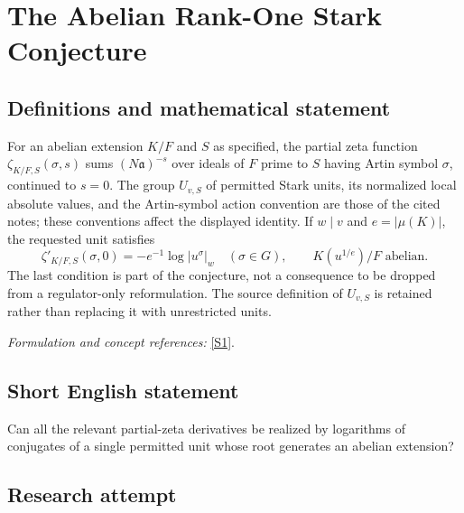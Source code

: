 \documentclass[11pt,a4paper]{article}
\newcommand{\sref}[2]{\hyperlink{source:#1:#2}{[S#2]}}
\newif\ifshowcatalogue
\newcommand{\cataloguescope}[1]{\ifshowcatalogue
 \paragraph{Exact scope in the supplied catalogue.}
 \begin{quote}\small #1\end{quote}\fi}
\numberwithin{equation}{section}
\begin{document}
\setcounter{section}{0}
\clearpage
\section*{\texorpdfstring{The Abelian Rank-One Stark Conjecture}{The Abelian Rank-One Stark Conjecture}}\label{statement}
\subsection{Definitions and mathematical statement}
For an abelian extension $K/F$ and $S$ as specified, the partial zeta function $\zeta_{K/F,S}(\sigma,s)$ sums $(N\mathfrak a)^{-s}$ over ideals of $F$ prime to $S$ having Artin symbol $\sigma$, continued to $s=0$. The group $U_{v,S}$ of permitted Stark units, its normalized local absolute values, and the Artin-symbol action convention are those of the cited notes; these conventions affect the displayed identity. If $w\mid v$ and $e=|\mu(K)|$, the requested unit satisfies
\[
 \zeta'_{K/F,S}(\sigma,0)=-e^{-1}\log|u^\sigma|_w
 \quad(\sigma\in G),\qquad K(u^{1/e})/F\text{ abelian}.
\]
The last condition is part of the conjecture, not a consequence to be dropped from a regulator-only reformulation. The source definition of $U_{v,S}$ is retained rather than replacing it with unrestricted units.
\par\smallskip\textit{Formulation and concept references:} \sref{statement}{1}.
\cataloguescope{Let K/F be an abelian extension of number fields with Galois group G, and let S be a finite set of places of F containing the archimedean and ramified places, with |S| >= 2 and at least one place v of S splitting completely in K. Prove that, for a fixed place w of K above v, there exists a unit u in U\_\{v,S\} such that zeta'\_\{K/F,S\}(sigma, 0) = -(1/e) log |u\textasciicircum{}sigma|\_w for all sigma in G, where e is the number of roots of unity in K, and K(u\textasciicircum{}\{1/e\})/F is abelian.}
\subsection{Short English statement}
Can all the relevant partial-zeta derivatives be realized by logarithms of conjugates of a single permitted unit whose root generates an abelian extension?
\subsection{Research attempt}
\end{document}
